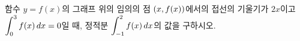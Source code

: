 함수 $y=f(x)$의 그래프 위의 임의의 점 $(x{,}\mkern3mu\mathopen{}f(x))$에서의 접선의 기울기가 $2x$이고 $\displaystyle\int_{0}^{3} f(x)\mkern3mu dx=0$일 때, 정적분 $\displaystyle\int_{-1}^{2} f(x)\mkern3mu dx$의 값을 구하시오.
